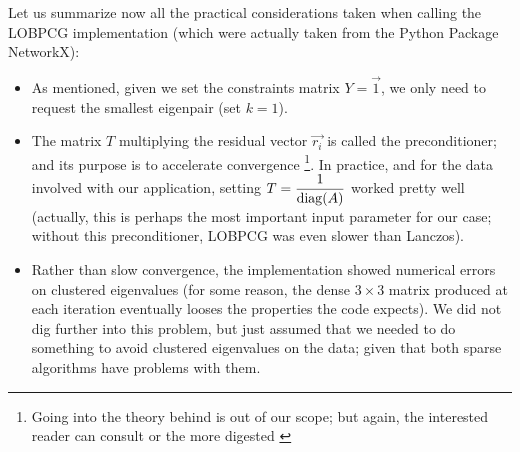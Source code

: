 Let us summarize now all the practical considerations taken when
calling the LOBPCG implementation (which were actually taken from the
Python Package NetworkX):

\begin{itemize}
\item As mentioned, given we set the constraints matrix $Y = \vec{1}$,
  we only need to request the smallest eigenpair (set $k=1$). 
\item The matrix $T$ multiplying the residual vector $\vec{r_i}$ is called
  the preconditioner; and its purpose is to accelerate
  convergence \footnote{Going into the theory behind is out of
    our scope; but again,  the interested reader can consult \cite{knyazev01}
    or the more digested \cite{lashuk07}}. In practice, and for the
  data involved with our application, setting $T =
  \dfrac{1}{\operatorname{diag}(A)}$ worked pretty well (actually, this is
  perhaps the most important input parameter for our case; without
  this preconditioner, LOBPCG was even slower than Lanczos). 
\item Rather than slow convergence, the implementation showed
  numerical errors on clustered eigenvalues (for some reason, the
  dense $3 \times 3$ matrix produced at each iteration eventually
  looses the properties the code expects). We did not dig further into
  this problem, but just assumed that we needed to do something to
  avoid clustered eigenvalues on the data; given that both sparse
  algorithms have problems with them.
\end{itemize}

